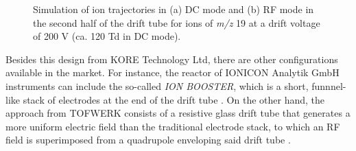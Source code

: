 \begin{figure}[t]
\centering
{}
\caption{Simulation of ion trajectories in (a) DC mode and (b) RF mode in the second half of the drift tube for ions of \textit{m/z} 19 at a drift voltage of 200 V (ca. 120 Td in DC mode).}
\label{fig:rfif_vs_dc}
\end{figure}





Besides this design from KORE Technology Ltd, there are other  configurations available in the market.
For instance, the reactor of IONICON Analytik GmbH instruments can include the so-called \textit{ION BOOSTER}, which is a short, funnnel-like stack of electrodes at the end of the drift tube
\cite{ionbooster}.
On the other hand, the approach from TOFWERK consists of a resistive glass drift tube that generates a more uniform electric field than the traditional electrode stack, to which an RF field is superimposed from a quadrupole enveloping said drift tube
\cite{krechmer2018evaluation}.


